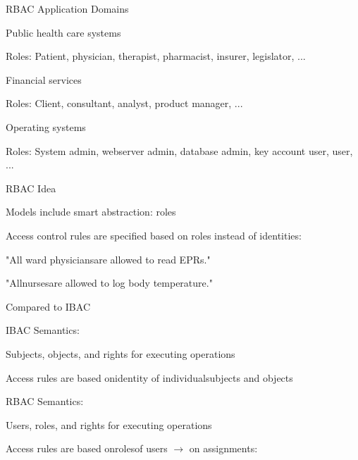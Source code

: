 \documentclass[a4paper]{article}
\begin{document}
\begin{multicols}{3}
    RBAC Application Domains
    \begin{itemize*}
        \item Public health care systems
              \begin{itemize*}
                  \item Roles: Patient, physician, therapist, pharmacist, insurer, legislator, ...
              \end{itemize*}
        \item Financial services
              \begin{itemize*}
                  \item Roles: Client, consultant, analyst, product manager, ...
              \end{itemize*}
        \item Operating systems
              \begin{itemize*}
                  \item Roles: System admin, webserver admin, database admin, key account user, user, ...
              \end{itemize*}
    \end{itemize*}

    RBAC Idea
    \begin{itemize*}
        \item Models include smart abstraction: roles
        \item Access control rules are specified based on roles instead of identities:
              \begin{itemize*}
                  \item "All ward physiciansare allowed to read EPRs."
                  \item "Allnursesare allowed to log body temperature."
              \end{itemize*}
        \item Compared to IBAC
              \begin{itemize*}
                  \item IBAC Semantics:
                        \begin{itemize*}
                            \item Subjects, objects, and rights for executing operations
                            \item Access rules are based onidentity of individualsubjects and objects
                        \end{itemize*}
                  \item RBAC Semantics:
                        \begin{itemize*}
                            \item Users, roles, and rights for executing operations
                            \item Access rules are based onrolesof users $\rightarrow$ on assignments:
                        \end{itemize*}
              \end{itemize*}
    \end{itemize*}



\end{multicols}
\end{document}
